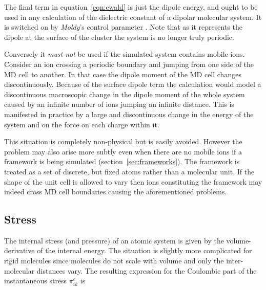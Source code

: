 \documentclass[a4paper,twoside]{report}
\newcommand{\moldy}{\emph{Moldy}}
\begin{document}
The final term in equation~\ref{eqn:ewald} is just the dipole energy,
and ought to be used in any calculation of the dielectric constant of
a dipolar molecular system.  It is switched on by \moldy's control
parameter .  Note that as it represents the
dipole at the surface of the cluster the system is no longer truly
periodic.

Conversely it \emph{must not} be used if the simulated system contains
mobile ions.  Consider an ion crossing a periodic boundary and jumping
from one side of the MD cell to another.  In that case the dipole
moment of the MD cell changes discontinuously.   Because of the
surface dipole term the calculation would model a discontinuous
macroscopic change in the dipole moment of the whole system caused by
an infinite number of ions jumping an infinite distance.  This is
manifested in practice by a large and discontinuous change in the
energy of the system and on the force on each charge within it.

This situation is completely non-physical but is easily avoided.
However the problem may also arise more subtly even when there are no
mobile ions if a framework is being simulated
(section~\ref{sec:frameworks}).  The framework is treated as a set of
discrete, but fixed atoms rather than a molecular unit.  If the shape
of the unit cell is allowed to vary then ions constituting the
framework may indeed cross MD cell boundaries causing the
aforementioned problems.

\subsection{Stress}

The internal stress (and pressure) of an atomic system is given by the
volume-derivative of the internal energy.  The situation is slightly
more complicated for rigid molecules since molecules do not scale with
volume and only the inter-molecular distances vary.  The resulting
expression for the Coulombic part of the instantaneous stress
$\pi_{ik}^e$ is\cite[Appendix A]{nose:83}
\end{document}
